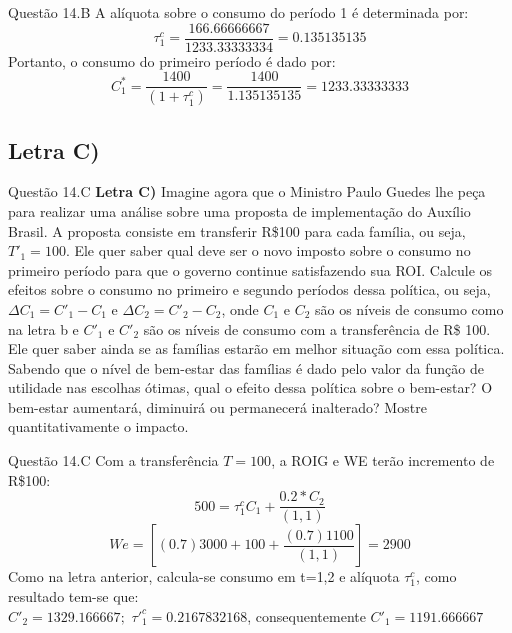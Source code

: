\documentclass[aspectratio=169]{beamer}
\begin{document}
\begin{frame}{Questão 14.B}
A alíquota sobre o consumo do período 1 é determinada por:
\begin{equation}
    \tau_1^c = \frac{166.66666667}{1233.33333334} = 0.135135135
\end{equation}
Portanto, o consumo do primeiro período é dado por:
\begin{equation}
    C_1^*=\frac{1400}{(1+\tau_1^c)}=\frac{1400}{1.135135135}=1233.33333333
\end{equation}
\end{frame}

\subsection{Letra C)}
\begin{frame}{Questão 14.C}
\textbf{Letra C)} Imagine agora que o Ministro Paulo Guedes lhe peça para realizar uma análise sobre uma proposta de implementação do Auxílio Brasil. A proposta consiste em transferir R\$100 para cada família, ou seja, $T'_1 = 100$. Ele quer saber qual deve ser o novo imposto sobre o consumo no primeiro período para que o governo continue satisfazendo sua ROI. Calcule os efeitos
sobre o consumo no primeiro e segundo períodos dessa política, ou seja, $\Delta C_1 = C'_1 - C_1$ e $\Delta C_2 = C'_2 - C_2$, onde $C_1$ e $C_2$ são os níveis de consumo como na letra b e $C'_1$ e $C'_2$ são os níveis de consumo com a transferência de R\$ 100. Ele quer saber ainda se as famílias estarão em melhor situação com essa política. Sabendo que o nível de bem-estar das famílias é dado pelo valor da função de utilidade nas escolhas ótimas, qual o efeito dessa política sobre o bem-estar? O bem-estar aumentará, diminuirá ou permanecerá inalterado? Mostre quantitativamente o impacto.
\end{frame}

\begin{frame}{Questão 14.C}
Com a transferência $T=100$, a ROIG e WE terão incremento de R\$100:
\begin{equation}
    500 = \tau_1^c C_1 + \frac{0.2*C_2}{(1,1)}
\end{equation}
\begin{equation}
    We=\left[(0.7)3000 + 100 + \frac{(0.7)1100}{(1,1)}\right] = 2900
\end{equation}
Como na letra anterior, calcula-se consumo em t={1,2} e alíquota $\tau_1^c$, como resultado tem-se que:\\
\vspace{10pt}
$C'_2 = 1329.166667;$ $\tau'_1^c= 0.2167832168$, consequentemente $C'_1 = 1191.666667$
\end{frame}
\end{document}
